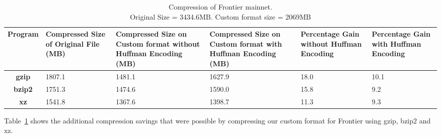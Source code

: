 \begin{table}
	\centering
\captionsetup{justification=centering}
\begin{tabular}{ >{\bfseries}c| p{2cm} | p{2cm} | p{2cm} | p{1.5cm} | p{1.5cm} }
	Program & {Compressed Size of Original File (MB)} & {Compressed Size on Custom format without Huffman Encoding (MB)} & {Compressed Size on Custom format with Huffman Encoding (MB)} &Percentage Gain without Huffman Encoding & Percentage Gain with Huffman Encoding\\
  \hline
  gzip  & 1807.1 & 1481.1 & 1627.9 & 18.0 & 10.1 \\
  bzip2 & 1751.3 & 1474.6 & 1590.0 & 15.8 & 9.2 \\
  xz   & 1541.8 & 1367.6 & 1398.7 & 11.3  & 9.3 \\
\end{tabular}
\caption{Compression of Frontier mainnet. \\ Original Size = 3434.6MB. Custom format size = 2069MB}
\label{tab:compfrontier}
\end{table}
Table~\ref{tab:compfrontier} 
shows the additional compression savings that were possible by compressing 
our custom format for Frontier  using gzip, bzip2 and xz.


